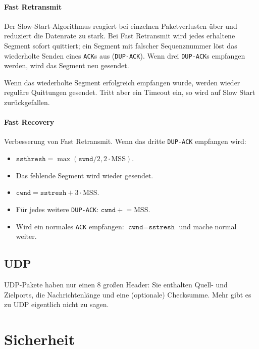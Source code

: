 \documentclass[a4paper,parskip=half*,DIV=15,fontsize=11pt]{scrartcl}
\begin{document}
\paragraph{Fast Retransmit}

Der Slow-Start-Algorithmus reagiert bei einzelnen Paketverlusten über und reduziert die Datenrate zu stark. Bei Fast Retransmit wird jedes erhaltene Segment sofort quittiert; ein Segment mit falscher Sequenznummer löst das wiederholte Senden eines \lstinline{ACK}s aus (\lstinline{DUP-ACK}). Wenn drei \lstinline{DUP-ACK}s empfangen werden, wird das Segment neu gesendet.

Wenn das wiederholte Segment erfolgreich empfangen wurde, werden wieder reguläre Quittungen gesendet. Tritt aber ein Timeout ein, so wird auf Slow Start zurückgefallen.

\paragraph{Fast Recovery}

Verbesserung von Fast Retransmit. Wenn das dritte \lstinline{DUP-ACK} empfangen wird:

\begin{itemize}
\item $\texttt{ssthresh} = \max(\texttt{swnd}/2, 2 \cdot \mathrm{MSS})$.
\item Das fehlende Segment wird wieder gesendet.
\item $\texttt{cwnd} = \texttt{sstresh} + 3 \cdot \mathrm{MSS}$.
\item Für jedes weitere \lstinline{DUP-ACK}: $\texttt{cwnd} \mathrel{+}= \mathrm{MSS}$.
\item Wird ein normales \lstinline{ACK} empfangen: $\texttt{cwnd} = \texttt{sstresh}$ und mache normal weiter.
\end{itemize}

\subsection{UDP}

UDP-Pakete haben nur einen \SI{8}{\byte} großen Header: Sie enthalten Quell- und Zielports, die Nachrichtenlänge und eine (optionale) Checksumme. Mehr gibt es zu UDP eigentlich nicht zu sagen.

\section{Sicherheit}
\end{document}
